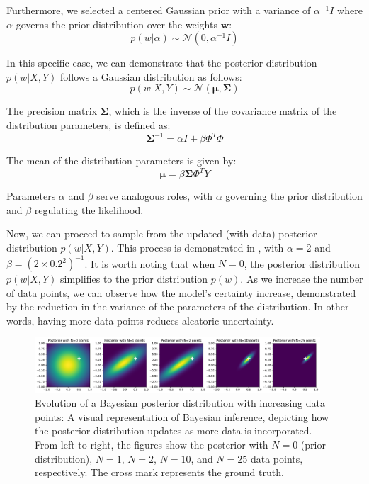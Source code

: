 Furthermore, we selected a centered Gaussian prior with a variance of $ \alpha^{-1}I $ where $\alpha$ governs the prior distribution over the weights $\mathbf{w}$:
\[ p(w | \alpha) \sim \mathcal{N}(0, \alpha^{-1}I) \]

In this specific case, we can demonstrate that the posterior distribution $ p(w | X, Y) $ follows a Gaussian distribution as follows:
\[ p(w | X, Y) \sim \mathcal{N}(\boldsymbol{\mu}, \boldsymbol{\Sigma}) \]

The precision matrix $ \boldsymbol{\Sigma} $, which is the inverse of the covariance matrix of the distribution parameters, is defined as:
\[ \boldsymbol{\Sigma}^{-1} = \alpha I + \beta \Phi^T \Phi \]

The mean of the distribution parameters is given by:
\[ \boldsymbol{\mu} = \beta \boldsymbol{\Sigma} \Phi^T Y \]

Parameters $\alpha$ and $\beta$ serve analogous roles, with $\alpha$ governing the prior distribution and $\beta$ regulating the likelihood.

Now, we can proceed to sample from the updated (with data) posterior distribution $p(w | X, Y)$. This process is demonstrated in , with $\alpha = 2$ and $\beta = (2 \times 0.2^2)^{-1}$. It is worth noting that when $N=0$, the posterior distribution $p(w|X,Y)$ simplifies to the prior distribution $p(w)$. As we increase the number of data points, we can observe how the model's certainty increase, demonstrated by the reduction in the variance of the parameters of the distribution. In other words, having more data points reduces aleatoric uncertainty.

\begin{figure}[H]
    \centering
    \includegraphics[width=0.95\textwidth]{posterior.pdf}
    \caption{Evolution of a Bayesian posterior distribution with increasing data points: A visual representation of Bayesian inference, depicting how the posterior distribution updates as more data is incorporated. From left to right, the figures show the posterior with $N=0$ (prior distribution), $N=1$, $N=2$, $N=10$, and $N=25$ data points, respectively. The cross mark represents the ground truth.}
    \label{fig:posterior}
\end{figure}

